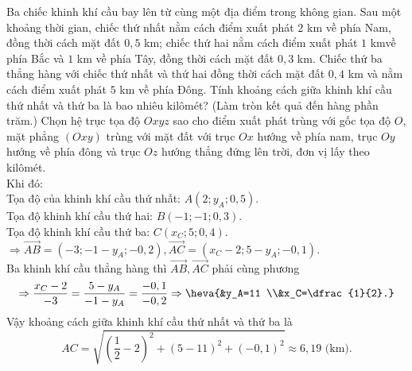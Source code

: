 \begin{bt}%
	Ba chiếc khinh khí cầu bay lên từ cùng một địa điểm trong không gian. Sau một khoảng thời gian, chiếc thứ nhất nằm cách điểm xuất phát $2$ km về phía Nam, đồng thời cách mặt đất $0,5$ km; chiếc thứ hai nằm cách điểm xuất phát $1$ kmvề phía Bắc và $1$ km về phía Tây, đồng thời cách mặt đất $0,3$ km. Chiếc thứ ba thẳng hàng với chiếc thứ nhất và thứ hai đồng thời cách mặt đất $0,4$ km và nằm cách điểm xuất phát $5$ km về phía Đông. Tính khoảng cách giữa khinh khí cầu thứ nhất và thứ ba là bao nhiêu kilômét? (Làm tròn kết quả đến hàng phần trăm.)
	\loigiai
	{
		Chọn hệ trục tọa độ $Oxyz$ sao cho điểm xuất phát trùng với gốc tọa độ $O$, mặt phẳng $\left(Oxy\right)$ trùng với mặt đất với trục $Ox$ hướng về phía nam, trục $Oy$ hướng về phía đông và trục $Oz$ hướng thẳng đứng lên trời, đơn vị lấy theo kilômét.\\
		Khi đó:\\
		Tọa độ của khinh khí cầu thứ nhất: $A\left(2;y_A;0,5\right)$.\\
		Tọa độ khinh khí cầu thứ hai: $B\left(-1;-1;0,3\right)$.\\
		Tọa độ khinh khí cầu thứ ba: $C\left(x_C;5;0,4\right)$.\\
		$\Rightarrow \overrightarrow{AB}=\left(-3;-1-y_A;-0,2\right),\overrightarrow{AC}=\left(x_C-2;5-y_A;-0,1\right)$.\\
		Ba khinh khí cầu thẳng hàng thì $\overrightarrow{AB},\overrightarrow{AC}$ phải cùng phương
		$$\Rightarrow \dfrac{x_C-2}{-3}=\dfrac{5-y_A}{-1-y_A}=\dfrac{-0,1}{-0,2}\Rightarrow \heva{&y_A=11 \\&x_C=\dfrac{1}{2}.}$$
		Vậy khoảng cách giữa khinh khí cầu thứ nhất và thứ ba là $$AC=\sqrt{\left(\dfrac{1}{2}-2\right)^2+\left(5-11\right)^2+\left(-0,1\right)^2}\approx 6{,}19\text{ (km).}$$
	}
\end{bt}

